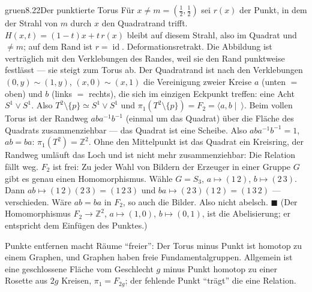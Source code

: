 \begin{loesungkarte}{gruen}{8.22}{Der punktierte Torus}
Für $x\neq m = (\frac12, \frac12)$ sei $r(x)$ der Punkt, in dem der Strahl von $m$ durch $x$ den Quadratrand trifft. $H(x, t) = (1 - t)x + t\,r(x)$ bleibt auf diesem Strahl, also im Quadrat und $\neq m$; auf dem Rand ist $r = \operatorname{id}$. Deformationsretrakt. Die Abbildung ist verträglich mit den Verklebungen des Randes, weil sie den Rand punktweise festlässt --- sie steigt zum Torus ab.
Der Quadratrand ist nach den Verklebungen $(0, y)\sim(1, y)$, $(x, 0)\sim(x, 1)$ die Vereinigung zweier Kreise $a$ (unten $=$ oben) und $b$ (links $=$ rechts), die sich im einzigen Eckpunkt treffen: eine Acht $S^{1}\vee S^{1}$. Also $T^{2}\setminus\{p\}\simeq S^{1}\vee S^{1}$ und $\pi_1(T^{2}\setminus\{p\}) = F_2 = \langle a, b\mid\ \rangle$.
Beim vollen Torus ist der Randweg $aba^{-1}b^{-1}$ (einmal um das Quadrat) über die Fläche des Quadrats zusammenziehbar --- das Quadrat ist eine Scheibe. Also $aba^{-1}b^{-1} = 1$, $ab = ba$: $\pi_1(T^{2}) = \mathbb Z^{2}$. Ohne den Mittelpunkt ist das Quadrat ein Kreisring, der Randweg umläuft das Loch und ist nicht mehr zusammenziehbar: Die Relation fällt weg.
$F_2$ ist frei: Zu jeder Wahl von Bildern der Erzeuger in einer Gruppe $G$ gibt es genau einen Homomorphismus. Wähle $G = S_3$, $a\mapsto(1\,2)$, $b\mapsto(2\,3)$. Dann $ab\mapsto(1\,2)(2\,3) = (1\,2\,3)$ und $ba\mapsto(2\,3)(1\,2) = (1\,3\,2)$ --- verschieden. Wäre $ab = ba$ in $F_2$, so auch die Bilder. Also nicht abelsch. $\blacksquare$ (Der Homomorphismus $F_2\to\mathbb Z^{2}$, $a\mapsto(1, 0)$, $b\mapsto(0, 1)$, ist die Abelisierung; er entspricht dem Einfügen des Punktes.)
\begin{mitnehmen}\kastentext
Punkte entfernen macht Räume \enquote{freier}: Der Torus minus Punkt ist homotop zu einem Graphen, und Graphen haben freie Fundamentalgruppen. Allgemein ist eine geschlossene Fläche vom Geschlecht $g$ minus Punkt homotop zu einer Rosette aus $2g$ Kreisen, $\pi_1 = F_{2g}$; der fehlende Punkt \enquote{trägt} die eine Relation.
\end{mitnehmen}
\end{loesungkarte}

